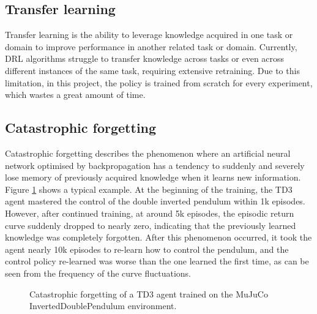 \subsection{Transfer learning}

Transfer learning is the ability to leverage knowledge acquired in one task or domain to improve performance in another related task or domain. Currently, DRL algorithms struggle to transfer knowledge across tasks or even across different instances of the same task, requiring extensive retraining. Due to this limitation, in this project, the policy is trained from scratch for every experiment, which wastes a great amount of time.

\subsection{Catastrophic forgetting}

Catastrophic forgetting describes the phenomenon where an artificial neural network optimised by backpropagation has a tendency to suddenly and severely lose memory of previously acquired knowledge when it learns new information. Figure \ref{fig:catastrophic-forgetting} shows a typical example. At the beginning of the training, the TD3 agent mastered the control of the double inverted pendulum within 1k episodes. However, after continued training, at around 5k episodes, the episodic return curve suddenly dropped to nearly zero, indicating that the previously learned knowledge was completely forgotten. After this phenomenon occurred, it took the agent nearly 10k episodes to re-learn how to control the pendulum, and the control policy re-learned was worse than the one learned the first time, as can be seen from the frequency of the curve fluctuations.

\begin{figure}[htbp]
   \centering
   
   \caption{Catastrophic forgetting of a TD3 agent trained on the MuJuCo InvertedDoublePendulum environment.}
   \label{fig:catastrophic-forgetting}
\end{figure}
